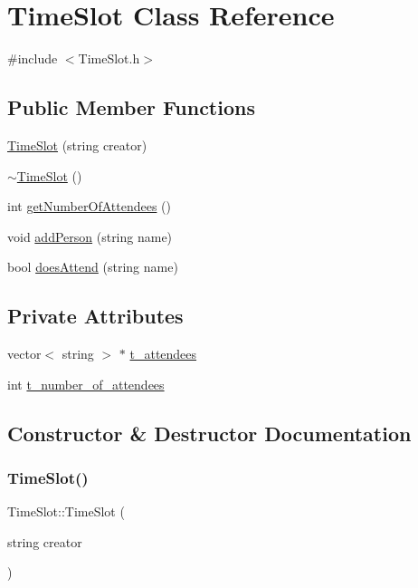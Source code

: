 \hypertarget{class_time_slot}{}\section{Time\+Slot Class Reference}
\label{class_time_slot}


{\ttfamily \#include $<$Time\+Slot.\+h$>$}

\subsection*{Public Member Functions}
\begin{DoxyCompactItemize}
\item 
\hyperlink{class_time_slot_a35860819682e1cb7867f3d958b3d76cb}{Time\+Slot} (string creator)
\item 
\hyperlink{class_time_slot_abd88f944c5d276ec0f94153095eb16d1}{$\sim$\+Time\+Slot} ()
\item 
int \hyperlink{class_time_slot_adfc2838008fa5f52a2f006187764ed3c}{get\+Number\+Of\+Attendees} ()
\item 
void \hyperlink{class_time_slot_afdce07b2639b2f3b451ccdbb83c36291}{add\+Person} (string name)
\item 
bool \hyperlink{class_time_slot_ab2b56bf1b3d0405e6ba66500667f83fc}{does\+Attend} (string name)
\end{DoxyCompactItemize}
\subsection*{Private Attributes}
\begin{DoxyCompactItemize}
\item 
vector$<$ string $>$ $\ast$ \hyperlink{class_time_slot_af74c9a337132bdf41a884afa672f5fb2}{t\+\_\+attendees}
\item 
int \hyperlink{class_time_slot_a601a4893958c7880308093482ab4ccf8}{t\+\_\+number\+\_\+of\+\_\+attendees}
\end{DoxyCompactItemize}


\subsection{Constructor \& Destructor Documentation}
\mbox{\label{class_time_slot_a35860819682e1cb7867f3d958b3d76cb}} 
\subsubsection{\texorpdfstring{Time\+Slot()}{TimeSlot()}}
{\footnotesize\ttfamily Time\+Slot\+::\+Time\+Slot (\begin{DoxyParamCaption}\item[{string}]{creator }\end{DoxyParamCaption})}

